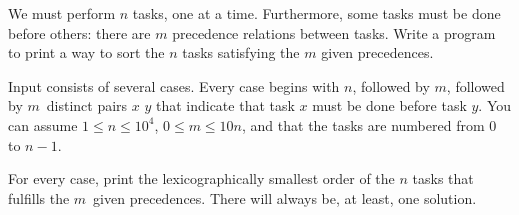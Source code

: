 

\Statement

We must perform $n$ tasks, one at a time.
Furthermore, some tasks must be done before others:
there are $m$ precedence relations between tasks.
Write a program to print a way to sort the $n$ tasks
satisfying the $m$ given precedences.


\Input

Input consists of several cases.
Every case begins with $n$,
followed by $m$,
followed by $m$~distinct pairs $x$ $y$
that indicate that task $x$ must be done before task $y$.
You can assume $1 \le n \le 10^4$,
$0 \le m \le 10n$,
and that the tasks are numbered from 0 to $n - 1$.


\Output

For every case, print the lexicographically smallest order
of the $n$ tasks that fulfills the $m$~given precedences.
There will always be, at least, one solution.


\Sample

